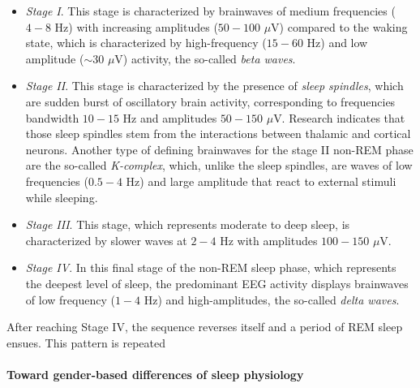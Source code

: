 \begin{itemize}
\item \emph{Stage I}. This stage is characterized by brainwaves of medium frequencies ($4-8$ Hz) with increasing amplitudes ($50 - 100$ $\mu$V) compared to the waking state, which is characterized by high-frequency ($15-60$ Hz) and low amplitude ($\sim 30$ $\mu$V) activity, the so-called \emph{beta waves}.

\item \emph{Stage II}. This stage is characterized by the presence of \emph{sleep spindles}, which are sudden burst of oscillatory brain activity, corresponding to frequencies bandwidth $10-15$ Hz and amplitudes $50-150$ $\mu$V. Research indicates that those sleep spindles stem from the interactions between thalamic and cortical neurons. Another type of defining brainwaves for the stage II non-REM phase are the so-called \emph{K-complex}, which, unlike the sleep spindles, are waves of low frequencies ($0.5 - 4$ Hz) and large amplitude that react to external stimuli while sleeping. 

\item \emph{Stage III}.  This stage, which represents moderate to deep sleep, is characterized by slower waves at $2 - 4$ Hz with amplitudes $100 - 150$ $\mu$V. 

\item \emph{Stage IV}. In this final stage of the non-REM sleep phase, which represents the deepest level of sleep, the predominant EEG activity displays brainwaves of low frequency ($1-4$ Hz) and high-amplitudes, the so-called \emph{delta waves}.
\end{itemize}

After reaching Stage IV, the sequence reverses itself and a period of REM sleep ensues. This pattern is repeated 
\paragraph{Toward gender-based differences of sleep physiology}